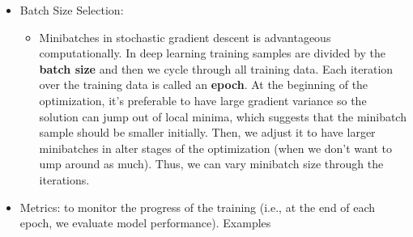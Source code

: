 \documentclass[
]{book}
\providecommand{\tightlist}{%
  \setlength{\itemsep}{0pt}\setlength{\parskip}{0pt}}
\begin{document}
\begin{itemize}
\begin{itemize}
  \item
    \textbf{Pretraining}: we use a pretrained network as starting values in backpropagation algorithm (or in cases that you have a huge sample has been used to train a network, just use the pretrained model directly). We typically use this method in image classification because many architectures have been trained on ImageNet already (about 1k categories, and 1.4 mil images). In the early days of deep models, other form of unsupervised generative pre training were used (e..g, layered restricted Boltzmann machines, autoencoders).
  \end{itemize}
\item
  Batch Size Selection:

  \begin{itemize}
  \tightlist
  \item
    Minibatches in stochastic gradient descent is advantageous computationally. In deep learning training samples are divided by the \textbf{batch size} and then we cycle through all training data. Each iteration over the training data is called an \textbf{epoch}. At the beginning of the optimization, it's preferable to have large gradient variance so the solution can jump out of local minima, which suggests that the minibatch sample should be smaller initially. Then, we adjust it to have larger minibatches in alter stages of the optimization (when we don't want to ump around as much). Thus, we can vary minibatch size through the iterations.
  \end{itemize}
\item
  Metrics: to monitor the progress of the training (i.e., at the end of each epoch, we evaluate model performance). Examples


\end{itemize}
\end{document}
